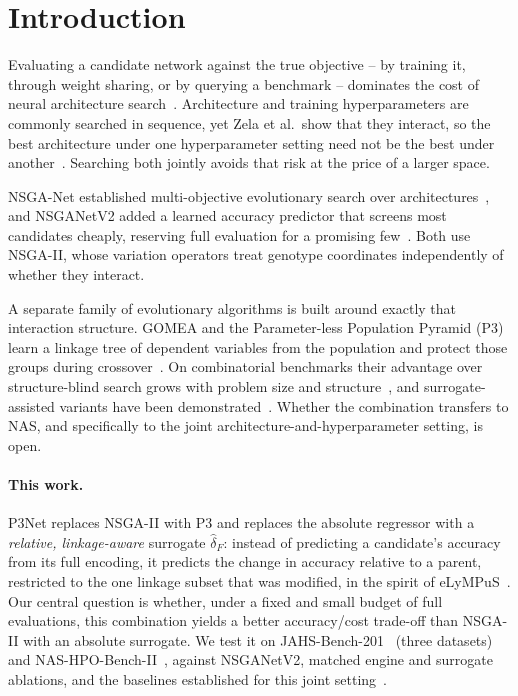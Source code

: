 \section{Introduction}
\label{sec:introduction}

Evaluating a candidate network against the true objective -- by training it, through weight sharing, or by
querying a benchmark -- dominates the cost of neural architecture search~\citep{white2023insights,liu2023survey}.
Architecture and training hyperparameters are commonly searched in sequence, yet Zela et al.\ show that they
interact, so the best architecture under one hyperparameter setting need not be the best under
another~\citep{zela2018towards}. Searching both jointly avoids that risk at the price of a larger space.

NSGA-Net established multi-objective evolutionary search over architectures~\citep{lu2019nsganet}, and
NSGANetV2 added a learned accuracy predictor that screens most candidates cheaply, reserving full evaluation for
a promising few~\citep{lu2020nsganetv2}. Both use NSGA-II, whose variation operators treat genotype coordinates
independently of whether they interact.

A separate family of evolutionary algorithms is built around exactly that interaction structure. GOMEA and the
Parameter-less Population Pyramid (P3) learn a linkage tree of dependent variables from the population and
protect those groups during crossover~\citep{thierens2011optimal,goldman2014parameterless}. On combinatorial
benchmarks their advantage over structure-blind search grows with problem size and
structure~\citep{goldman2015fast,qiao2024gomearuntime}, and surrogate-assisted variants have been
demonstrated~\citep{dushatskiy2019csgomea,dushatskiy2021novelsurrogateassistedevolutionaryalgorithm,przewozniczek2026lympus}.
Whether the combination transfers to NAS, and specifically to the joint architecture-and-hyperparameter setting,
is open.

\paragraph{This work.} P3Net replaces NSGA-II with P3 and replaces the absolute regressor with a
\emph{relative, linkage-aware} surrogate $\hat\delta_F$: instead of predicting a candidate's accuracy from its
full encoding, it predicts the change in accuracy relative to a parent, restricted to the one linkage subset that
was modified, in the spirit of eLyMPuS~\citep{przewozniczek2026lympus}. Our central question is whether, under a
fixed and small budget of full evaluations, this combination yields a better accuracy/cost trade-off than NSGA-II
with an absolute surrogate. We test it on JAHS-Bench-201~\citep{bansal2022jahsbench} (three datasets) and
NAS-HPO-Bench-II~\citep{hirose2021nashpobenchii}, against NSGANetV2, matched engine and surrogate ablations, and
the baselines established for this joint setting~\citep{guerreroviu2021bagofbaselines}.

